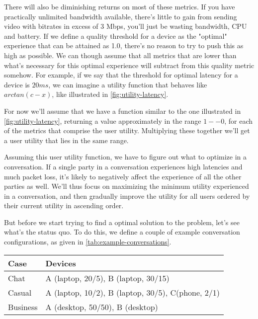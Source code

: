 There will also be diminishing returns on most of these metrics. If you have practically unlimited bandwidth available, there's little to gain from sending video with bitrates in excess of 3 Mbps, you'll just be wasting bandwidth, CPU and battery. If we define a quality threshold for a device as the "optimal" experience that can be attained as 1.0, there's no reason to try to push this as high as possible. We can though assume that all metrics that are lower than what's necessary for this optimal experience will subtract from this quality metric somehow. For example, if we say that the threshold for optimal latency for a device is \(20ms\), we can imagine a \gls{utility function} that behaves like \(arctan(c-x)\), like illustrated in \autoref{fig:utility-latency}.


For now we'll assume that we have a function similar to the one illustrated in \autoref{fig:utility-latency}, returning a value approximately in the range \(1 -- 0\), for each of the metrics that comprise the user utility. Multiplying these together we'll get a user utility that lies in the same range.

Assuming this user utility function, we have to figure out what to optimize in a conversation. If a single party in a conversation experiences high latencies and much packet loss, it's likely to negatively affect the experience of all the other parties as well. We'll thus focus on maximizing the minimum utility experienced in a conversation, and then gradually improve the utility for all users ordered by their current utility in ascending order.

But before we start trying to find a optimal solution to the problem, let's see what's the status quo. To do this, we define a couple of example conversation configurations, as given in \autoref{tab:example-conversations}.

\begin{center}
    \label{tab:example-conversations}
    \begin{tabular}{| l | l |}
    \hline
    \textbf{Case} & \textbf{Devices} \\ \hline
    Chat & A (laptop, 20/5), B (laptop, 30/15) \\ \hline
    Casual & A (laptop, 10/2), B (laptop, 30/5), C(phone, 2/1) \\ \hline
    Business & A (desktop, 50/50), B (desktop) \\ \hline
    \end{tabular}
\end{center}

